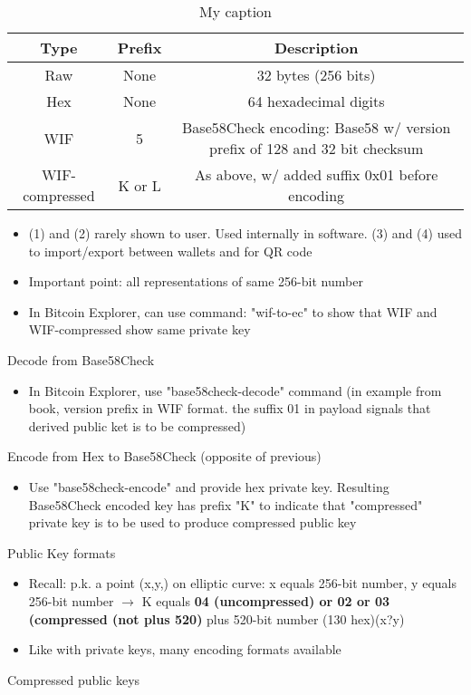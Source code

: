 \documentclass[english, 11pt]{article}
\begin{document}
\begin{table}[]
\centering
\caption{My caption}
\label{my-label}
\begin{tabular}{|c|c|c|}
\hline
\textbf{Type} & \textbf{Prefix} & \textbf{Description} \\ \hline
Raw & None & 32 bytes (256 bits) \\ \hline
Hex & None & 64 hexadecimal digits \\ \hline
WIF & 5 & Base58Check encoding: Base58 w/ version prefix of 128 and 32 bit checksum \\ \hline
WIF-compressed & K or L & As above, w/ added suffix 0x01 before encoding \\ \hline
\end{tabular}
\end{table}

\begin{itemize}
    \item (1) and (2) rarely shown to user. Used internally in software. (3) and (4) used to import/export between wallets and for QR code
    \item Important point: all representations of same 256-bit number
    \item In Bitcoin Explorer, can use command: "wif-to-ec" to show that WIF and WIF-compressed show same private key
\end{itemize}

Decode from Base58Check
\begin{itemize}
    \item In Bitcoin Explorer, use "base58check-decode" command (in example from book, version prefix in WIF format. the suffix 01 in payload signals that derived public ket is to be compressed)
\end{itemize}
Encode from Hex to Base58Check (opposite of previous)
\begin{itemize}
    \item Use "base58check-encode" and provide hex private key. Resulting Base58Check encoded key has prefix "K" to indicate that "compressed" private key is to be used to produce compressed public key
\end{itemize}
Public Key formats
\begin{itemize}
    \item Recall: p.k. a point (x,y,) on elliptic curve: x equals 256-bit number, y equals 256-bit number $\rightarrow$ K equals \textbf{04 (uncompressed) or 02 or 03 (compressed (not plus 520)} plus 520-bit number (130 hex)(x?y)
    \item Like with private keys, many encoding formats available
\end{itemize}
Compressed public keys
\end{document}
